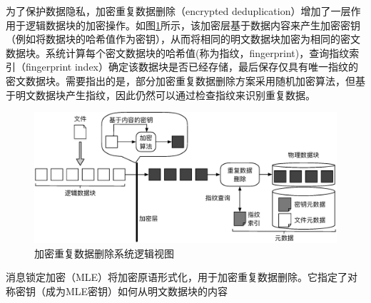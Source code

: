 为了保护数据隐私，加密重复数据删除（encrypted deduplication）增加了一层作用于逻辑数据块的加密操作。如图\ref{fig:加密重复数据删除系统逻辑视图}所示，该加密层基于数据内容来产生加密密钥\cite{bellare2013message}（例如将数据块的哈希值作为密钥\cite{douceur2002reclaiming}），从而将相同的明文数据块加密为相同的密文数据块。系统计算每个密文数据块的哈希值(称为指纹，fingerprint)，查询指纹索引（fingerprint index）确定该数据块是否已经存储，最后保存仅具有唯一指纹的密文数据块。需要指出的是，部分加密重复数据删除方案\cite{bellare2013message}采用随机加密算法，但基于明文数据块产生指纹，因此仍然可以通过检查指纹来识别重复数据。

\begin{figure}[!htb]
    \small
    \centering
    \includegraphics[width=\textwidth]{pic/EncryptDedupSystemLogic.eps}
    \caption{加密重复数据删除系统逻辑视图}
    \label{fig:加密重复数据删除系统逻辑视图}
\end{figure}

消息锁定加密（MLE）将加密原语形式化，用于加密重复数据删除。它指定了对称密钥（成为MLE密钥）如何从明文数据块的内容





